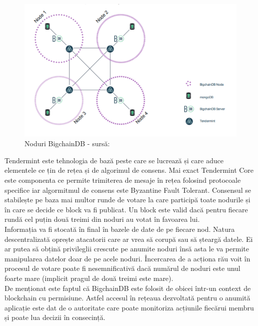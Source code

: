 \begin{figure}[H] 
\centering
\includegraphics[scale=0.9]{Images/BCDB_Nodes.png}
\caption{Noduri BigchainDB - sursă: \cite{BigchainDB_Art}}
\end{figure}

Tendermint \cite{Tendermint} este tehnologia de bază peste care se lucrează și care aduce elementele ce țin de rețea și de algorimul de consens. Mai exact Tendermint Core este componenta ce permite trimiterea de mesaje în rețea folosind protocoale specifice iar algormitmul de consens este Byzantine Fault Tolerant. Consensul se stabilește pe baza mai multor runde de votare la care participă toate nodurile și în care se decide ce block va fi publicat. Un block este valid dacă pentru fiecare rundă cel puțin două treimi din noduri au votat în favoarea lui.\\

Informația va fi stocată în final în bazele de date de pe fiecare nod. Natura descentralizată oprește atacatorii care ar vrea să corupă sau să șteargă datele. Ei ar putea să obțină privileglii crescute pe anumite noduri însă asta le va permite manipularea datelor doar de pe acele noduri. Încercarea de a acționa rău voit în procesul de votare poate fi nesemnificativă dacă numărul de noduri este unul foarte mare (implicit pragul de două treimi este mare).\\

De menționat este faptul că BigchainDB este folosit de obicei într-un context de blockchain cu permisiune. Astfel accesul în rețeaua dezvoltată pentru o anumită aplicație este dat de o autoritate care poate monitoriza acțiunile fiecărui membru și poate lua decizii în consecință.\\

